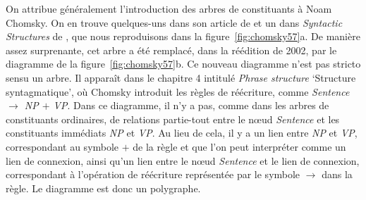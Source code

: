 {    On attribue généralement l’introduction des arbres de constituants à Noam Chomsky. On en trouve quelques-uns dans son article de \citeyear{chomsky1955three} et un dans \textit{Syntactic Structures} de \citeyear{chomsky1957syntactic}, que nous reproduisons dans la figure~\ref{fig:chomsky57}a. De manière assez surprenante, cet arbre a été remplacé, dans la réédition de 2002, par le diagramme de la figure~\ref{fig:chomsky57}b. Ce nouveau diagramme n’est pas stricto sensu un arbre. Il apparaît dans le chapitre 4 intitulé \textit{Phrase structure} ‘Structure syntagmatique’, où Chomsky introduit les règles de réécriture, comme \textit{Sentence $\rightarrow$ NP $+$ VP}. Dans ce diagramme, il n’y a pas, comme dans les arbres de constituants ordinaires, de relations partie-tout entre le nœud \textit{Sentence} et les constituants immédiats \textit{NP} et \textit{VP}. Au lieu de cela, il y a un lien entre \textit{NP} et \textit{VP}, correspondant au symbole $+$ de la règle et que l’on peut interpréter comme un lien de connexion, ainsi qu’un lien entre le nœud \textit{Sentence} et le lien de connexion, correspondant à l’opération de réécriture représentée par le symbole $\rightarrow$ dans la règle. Le diagramme est donc un polygraphe.

}
